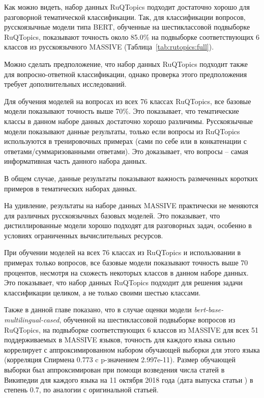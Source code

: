 Как можно видеть, набор данных {RuQTopics} подходит достаточно хорошо для разговорной тематической классификации. Так, для классификации вопросов, русскоязычные модели типа BERT, обученные на шестиклассовой подвыборке {RuQTopics}, показывают точность около 85.0\% на подвыборке соответствующих 6 классов из русскоязычного {MASSIVE} (Таблица~\ref{tab:rutopics:full}).

Можно сделать предположение, что набор данных {RuQTopics} подходит также для вопросно-ответной классификации, однако проверка этого предположения требует дополнительных исследований.

Для обучения моделей на вопросах из всех 76 классах {RuQTopics}, все базовые модели показывают точность выше 70\%. Это показывает, что тематические классы в данном наборе данных достаточно хорошо различимы.
Русскоязычные модели показывают данные результаты, только если вопросы из  {RuQTopics} используются в тренировочных примерах (сами по себе или в конкатенации с ответами/суммаризованными ответами). Это доказывает, что вопросы -- самая информативная часть данного набора данных.

В общем случае, данные результаты показывают важность размеченных коротких примеров в тематических наборах данных. 

На удивление, результаты на наборе данных {MASSIVE} практически не меняются для различных русскоязычных базовых моделей. Это показывает, что дистиллированные модели хорошо подходят для разговорных задач, особенно в условиях ограниченных вычислительных ресурсов.

При обучении моделей на всех 76 классах из {RuQTopics} и использовании в примерах только вопросов, все базовые модели показывают точность выше 70 процентов, несмотря на схожесть некоторых классов в данном наборе данных. Это показывает, что набор данных {RuQTopics} подходит для решения задачи классификации целиком, а не только своими шестью классами.

Также в данной главе показано, что в случае оценки модели  \textit{bert-base-multilingual-cased}, обученной на шестиклассовой подвыборке вопросов из {RuQTopics}, на подвыборке соответствующих 6 классов из {MASSIVE} для всех 51 поддерживаемых в {MASSIVE} языков, точность для каждого языка сильно коррелирует с аппроксимированном набором обучающей выборки для этого языка (корреляция Спирмена 0.773 c p-значением 2.997e-11). Размер обучающей выборки был аппроксимирован при помощи возведения числа статей в Википедии для каждого языка на 11 октября 2018 года (дата выпуска статьи \cite{bert}) в степень 0.7, по аналогии с оригинальной статьей.


